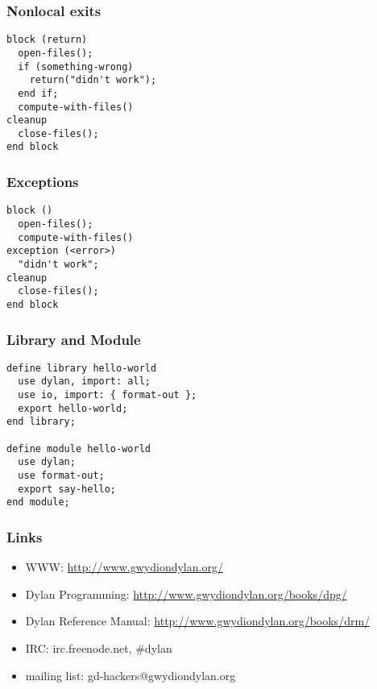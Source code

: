 \documentclass[compress]{beamer}
\begin{document}
\begin{frame}[fragile]
  \frametitle{Nonlocal exits}
  \begin{verbatim}
block (return)
  open-files();
  if (something-wrong)
    return("didn't work");
  end if;
  compute-with-files()
cleanup
  close-files();
end block
  \end{verbatim}
\end{frame}

\begin{frame}[fragile]
  \frametitle{Exceptions}
  \begin{verbatim}
block ()
  open-files();
  compute-with-files()
exception (<error>) 
  "didn't work";
cleanup
  close-files();
end block
  \end{verbatim}
\end{frame}

\begin{frame}[fragile]
  \frametitle{Library and Module}
  \begin{verbatim}
define library hello-world
  use dylan, import: all;
  use io, import: { format-out };
  export hello-world;
end library;

define module hello-world
  use dylan;
  use format-out;
  export say-hello;
end module;
  \end{verbatim}
\end{frame}

\begin{frame}
  \frametitle{Links}
  \begin{itemize}
  \item WWW: \url{http://www.gwydiondylan.org/}
  \item Dylan Programming: \url{http://www.gwydiondylan.org/books/dpg/}
  \item Dylan Reference Manual: \url{http://www.gwydiondylan.org/books/drm/}
  \item IRC: irc.freenode.net, \#dylan
  \item mailing list: gd-hackers@gwydiondylan.org
  \end{itemize}
\end{frame}
\end{document}
